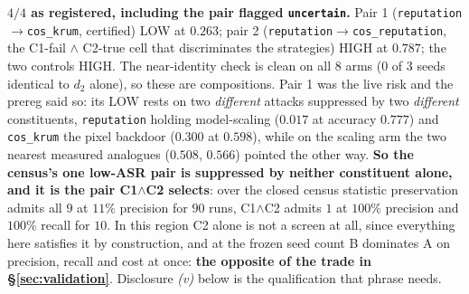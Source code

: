\documentclass{article}
\begin{document}
\noindent \textbf{$4/4$ as registered, including the pair flagged \texttt{uncertain}.} Pair 1 (\texttt{reputation}$\to$\texttt{cos\_krum}, certified) LOW at $0.263$; pair 2 (\texttt{reputation}$\to$\texttt{cos\_reputation}, the C1-fail $\wedge$ C2-true cell that discriminates the strategies) HIGH at $0.787$; the two controls HIGH. The near-identity check is clean on all $8$ arms ($0$ of $3$ seeds identical to $d_2$ alone), so these are compositions. Pair 1 was the live risk and the prereg said so: its LOW rests on two \emph{different} attacks suppressed by two \emph{different} constituents, \texttt{reputation} holding model-scaling ($0.017$ at accuracy $0.777$) and \texttt{cos\_krum} the pixel backdoor ($0.300$ at $0.598$), while on the scaling arm the two nearest measured analogues ($0.508$, $0.566$) pointed the other way. \textbf{So the census's one low-ASR pair is suppressed by neither constituent alone, and it is the pair C1$\wedge$C2 selects}: over the closed census statistic preservation admits all $9$ at $11\%$ precision for $90$ runs, C1$\wedge$C2 admits $1$ at $100\%$ precision and $100\%$ recall for $10$. In this region C2 alone is not a screen at all, since everything here satisfies it by construction, and at the frozen seed count B dominates A on precision, recall and cost at once: \textbf{the opposite of the trade in \S\ref{sec:validation}}. Disclosure \emph{(v)} below is the qualification that phrase needs.
\end{document}
